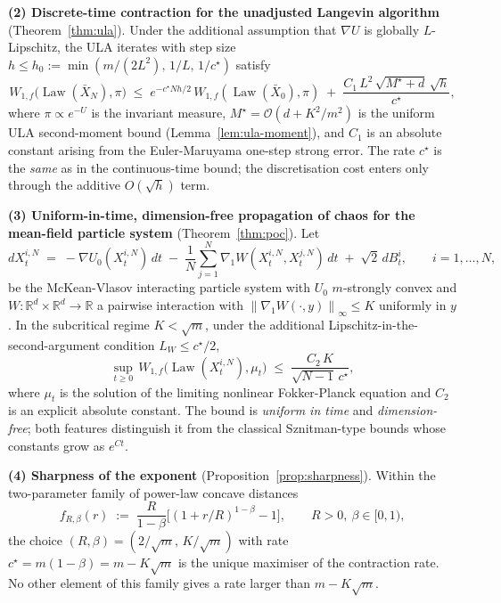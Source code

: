 \documentclass[11pt]{article}
\theoremstyle{definition}
\DeclareMathOperator{\Law}{Law}
\newcommand{\R}{\mathbb{R}}
\newcommand{\norm}[1]{\left\lVert #1 \right\rVert}
\begin{document}
\smallskip

\textbf{(2) Discrete-time contraction for the unadjusted Langevin algorithm} (Theorem~\ref{thm:ula}). Under the additional assumption that $\nabla U$ is globally $L$-Lipschitz, the ULA iterates with step size $h \le h_0 := \min(m/(2L^2),\, 1/L,\, 1/c^\star)$ satisfy
\[
W_{1,f}\bigl(\Law(\bar X_N), \pi\bigr) \;\le\; e^{-c^\star N h /2}\, W_{1,f}(\Law(\bar X_0), \pi) \;+\; \frac{C_1\, L^2\,\sqrt{M^\star + d}\,\sqrt h}{c^\star},
\]
where $\pi \propto e^{-U}$ is the invariant measure, $M^\star = \mathcal O(d + K^2/m^2)$ is the uniform ULA second-moment bound (Lemma~\ref{lem:ula-moment}), and $C_1$ is an absolute constant arising from the Euler-Maruyama one-step strong error. The rate $c^\star$ is the \emph{same} as in the continuous-time bound; the discretisation cost enters only through the additive $O(\sqrt h)$ term.

\smallskip

\textbf{(3) Uniform-in-time, dimension-free propagation of chaos for the mean-field particle system} (Theorem~\ref{thm:poc}). Let
\[
dX^{i,N}_t \;=\; -\nabla U_0(X^{i,N}_t)\,dt \;-\; \frac{1}{N}\sum_{j=1}^N \nabla_1 W(X^{i,N}_t, X^{j,N}_t)\,dt \;+\; \sqrt 2\,dB^i_t, \qquad i = 1,\dots, N,
\]
be the McKean-Vlasov interacting particle system with $U_0$ $m$-strongly convex and $W: \R^d \times \R^d \to \R$ a pairwise interaction with $\norm{\nabla_1 W(\cdot,y)}_\infty \le K$ uniformly in $y$. In the subcritical regime $K < \sqrt m$, under the additional Lipschitz-in-the-second-argument condition $L_W \le c^\star/2$,
\[
\sup_{t \ge 0}\,W_{1,f}\bigl(\Law(X^{i,N}_t), \mu_t\bigr) \;\le\; \frac{C_2\,K}{\sqrt{N-1}\, c^\star},
\]
where $\mu_t$ is the solution of the limiting nonlinear Fokker-Planck equation and $C_2$ is an explicit absolute constant. The bound is \emph{uniform in time} and \emph{dimension-free}; both features distinguish it from the classical Sznitman-type bounds whose constants grow as $e^{Ct}$.

\smallskip

\textbf{(4) Sharpness of the exponent} (Proposition~\ref{prop:sharpness}). Within the two-parameter family of power-law concave distances
\[
f_{R,\beta}(r) \;:=\; \frac{R}{1-\beta}\bigl[(1+r/R)^{1-\beta} - 1\bigr], \qquad R > 0,\ \beta \in [0,1),
\]
the choice $(R, \beta) = (2/\sqrt m,\, K/\sqrt m)$ with rate $c^\star = m(1-\beta) = m - K\sqrt m$ is the unique maximiser of the contraction rate. No other element of this family gives a rate larger than $m - K\sqrt m$.

\smallskip
\end{document}
